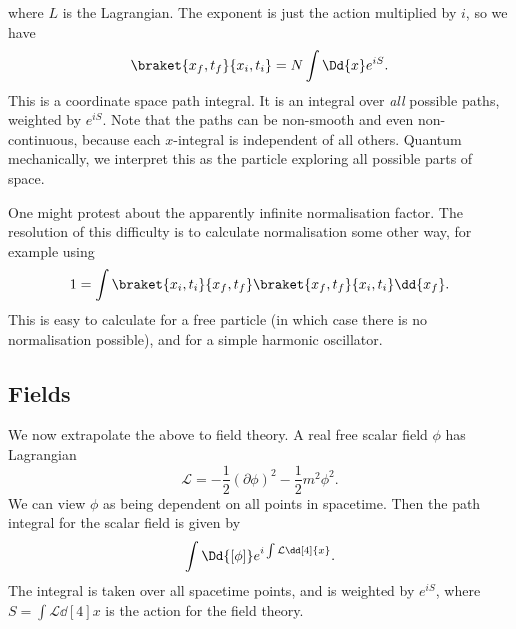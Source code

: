\documentclass{jknotes} %
\begin{document}
where \(L\) is the Lagrangian. The exponent is just the action multiplied by \(i\), so we have
\begin{equation}
    \braket{x_f,t_f}{x_i,t_i} = N\int\Dd{x}e^{iS}.
\end{equation}
This is a coordinate space path integral. It is an integral over \emph{all} possible paths, weighted by \(e^{iS}\). Note that the paths can be non-smooth and even non-continuous, because each \(x\)-integral is independent of all others. Quantum mechanically, we interpret this as the particle exploring all possible parts of space.

One might protest about the apparently infinite normalisation factor. The resolution of this difficulty is to calculate normalisation some other way, for example using
\begin{equation}
    1 = \int\braket{x_i,t_i}{x_f,t_f}\braket{x_f,t_f}{x_i,t_i}\dd{x_f}.
\end{equation}
This is easy to calculate for a free particle (in which case there is no normalisation possible), and for a simple harmonic oscillator.

\subsection{Fields}
We now extrapolate the above to field theory. A real free scalar field \(\phi\) has Lagrangian
\begin{equation}
    \mathcal{L} = -\frac{1}{2}(\partial\phi)^2 - \frac{1}{2}m^2\phi^2.
\end{equation}
We can view \(\phi\) as being dependent on all points in spacetime. Then the path integral for the scalar field is given by
\begin{equation}
    \int\Dd{[\phi]}e^{i\int\mathcal{L}\dd[4]{x}}.
\end{equation}
The integral is taken over all spacetime points, and is weighted by \(e^{iS}\), where \(S=\int\mathcal{L}\dd[4]{x}\) is the action for the field theory.
\end{document}
